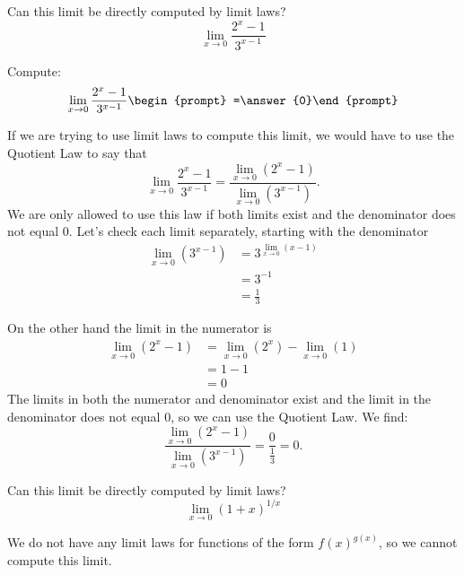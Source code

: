 \documentclass{ximera}
\begin{document}
\begin{question}
  Can this limit be directly computed by limit laws?
  \[
  \lim_{x\to0}\frac{2^x-1}{3^{x-1}}
  \]
  \begin{prompt}
  \begin{multipleChoice}
  \end{multipleChoice}
  \begin{question}
    Compute:
    \[
    \lim_{x\to0}\frac{2^x-1}{3^{x-1}}\begin{prompt} =\answer{0}\end{prompt}
    \]
    \begin{feedback}
      If we are trying to use limit laws to compute this limit, we
      would have to use the Quotient Law to say that
      \[
      \lim_{x\to 0}\frac{2^x-1}{3^{x-1}} = \frac{\lim_{x\to
          0}(2^x-1)}{\lim_{x\to 0}(3^{x-1})}.
      \]
      We are only allowed to use this law if both limits exist and the
      denominator does not equal $0$.  Let's check each limit
      separately, starting with the denominator
      \begin{align*}
        \lim_{x\to 0}(3^{x-1}) &=3^{\lim_{x\to0}(x-1)}\\
        &=3^{-1}\\
        &=\frac{1}{3}
      \end{align*}

      On the other hand the limit in the numerator is
      \begin{align*}
        \lim_{x\to 0}(2^x-1) &=\lim_{x\to0}(2^x)-\lim_{x\to0}(1)\\
        &=1-1\\
        &=0
      \end{align*}
      The limits in both the numerator and denominator exist and the
      limit in the denominator does not equal $0$, so we can use the
      Quotient Law.  We find:
      \[
        \frac{\lim_{x\to 0}(2^x-1)}{\lim_{x\to 0}(3^{x-1})}
        =\frac{0}{\frac{1}{3}}=0.
        \]
    \end{feedback}
  \end{question}
  \end{prompt}
\end{question}


\begin{question}
  Can this limit be directly computed by limit laws?
  \[
  \lim_{x\to 0}(1+x)^{1/x}
  \]
  \begin{prompt}
  \begin{multipleChoice}
  \end{multipleChoice}
  \begin{feedback}
  We do not have any limit laws for functions of the form $f(x)^{g(x)}$, so we cannot compute this limit.
  \end{feedback}
  \end{prompt}
\end{question}
\end{document}

